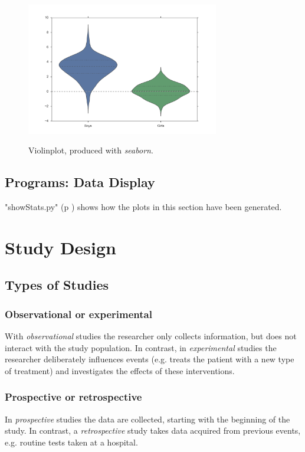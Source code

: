 \begin{figure}
  \centering
  \includegraphics[width=0.75\textwidth]{../Images/violinplot.png}\\
  \caption{Violinplot, produced with \emph{seaborn}.}\label{fig:violin}
\end{figure}

\subsection{Programs: Data Display}
\PyImg "showStats.py" (p \pageref{py:showStats}) shows how the plots in this section have been generated.

\section{Study Design}


\subsection{Types of Studies}

\subsubsection{Observational or experimental}
With \emph{observational} studies the researcher only collects information, but does not interact with the study population. In contrast, in \emph{experimental} studies the researcher deliberately influences events (e.g. treats the patient with a new type of treatment) and investigates the effects of these interventions.

\subsubsection{Prospective or retrospective}
In \emph{prospective} studies the data are collected, starting with the beginning of the study. In contrast, a \emph{retrospective} study takes data acquired from previous events, e.g. routine tests taken at a hospital.

